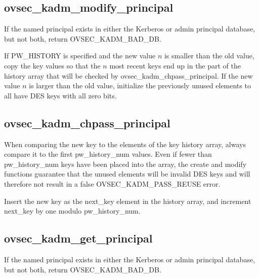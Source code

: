 \subsection{ovsec_kadm_modify_principal}

If the named principal exists in either the Kerberos or admin
principal database, but not both, return OVSEC_KADM_BAD_DB.

If PW_HISTORY is specified and the new value $n$ is smaller than the
old value, copy the key values so that the $n$ most recent keys end up
in the part of the history array that will be checked by
ovsec_kadm_chpass_principal.  If the new value $n$ is larger than the
old value, initialize the previously unused elements to all have DES
keys with all zero bits.

\subsection{ovsec_kadm_chpass_principal}

When comparing the new key to the elements of the key history array,
always compare it to the first pw_history_num values.  Even if fewer
than pw_history_num keys have been placed into the array, the create
and modify functions guarantee that the unused elements will be
invalid DES keys and will therefore not result in a false
OVSEC_KADM_PASS_REUSE error.

Insert the new key as the next_key element in the history array, and
increment next_key by one modulo pw_history_num.

\subsection{ovsec_kadm_get_principal}

If the named principal exists in either the Kerberos or admin
principal database, but not both, return OVSEC_KADM_BAD_DB.



